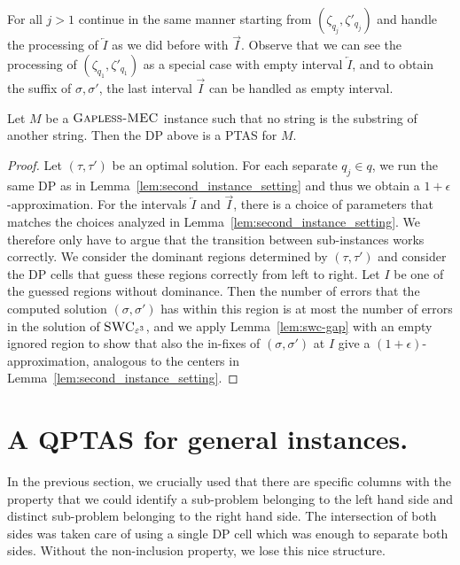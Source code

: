     For all $j > 1$ continue in the same manner starting from $(\zeta_{q_j},\zeta'_{q_j})$ and handle the processing of $\overleftarrow{I}$ as we did before with $\overrightarrow{I}$.
    Observe that we can see the processing of $(\zeta_{q_1},\zeta'_{q_1})$ as a special case with empty interval $\overleftarrow{I}$, and to obtain the suffix of $\sigma,\sigma'$, the last interval $\overrightarrow{I}$ can be handled as empty interval.

\begin{theorem}\label{thm:ptas}
    Let $M$ be a $\textsc{Gapless-MEC}$ instance such that no string is the substring of another string.
    Then the DP above is a PTAS for $M$.
\end{theorem}
\begin{proof}
    Let $(\tau,\tau')$ be an optimal solution.
    For each separate $q_j \in q$, we run the same DP as in Lemma~\ref{lem:second_instance_setting} and thus we obtain a $1+\epsilon$-approximation.
    For the intervals $\overleftarrow{I}$ and $\overrightarrow{I}$, there is a choice of parameters that matches the choices analyzed in Lemma~\ref{lem:second_instance_setting}.
    We therefore only have to argue that the transition between sub-instances works correctly.
    We consider the dominant regions determined by $(\tau,\tau')$ and consider the DP cells that guess these regions correctly from left to right.
    Let $I$ be one of the guessed regions without dominance.
    Then the number of errors that the computed solution $(\sigma,\sigma')$ has within this region is at most the number of errors in the solution of $\textsc{SWC}_{\varepsilon^3}$, and we apply Lemma~\ref{lem:swc-gap} with an empty ignored region to show that also the in-fixes of $(\sigma,\sigma')$ at $I$ give a $(1+\epsilon)$-approximation, analogous to the centers in Lemma~\ref{lem:second_instance_setting}.
\end{proof}

\section{A QPTAS for general instances.}\label{sec:QPTAS}

In the previous section, we crucially used that there are specific columns with the property that we could identify a sub-problem belonging to the left hand side and distinct sub-problem belonging to the right hand side.
The intersection of both sides was taken care of using a single DP cell which was enough to separate both sides.
Without the non-inclusion property, we lose this nice structure.

